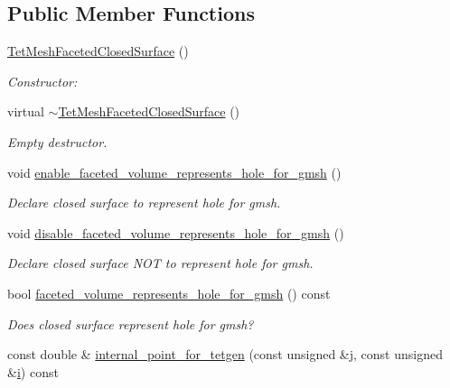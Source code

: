 \subsection*{Public Member Functions}
\begin{DoxyCompactItemize}
\item 
\hyperlink{classoomph_1_1TetMeshFacetedClosedSurface_a03485a256274531a3391fb0f86fa34ca}{Tet\+Mesh\+Faceted\+Closed\+Surface} ()
\begin{DoxyCompactList}\small\item\em Constructor\+: \end{DoxyCompactList}\item 
virtual \hyperlink{classoomph_1_1TetMeshFacetedClosedSurface_a5f1a8d02dedbefb9291d5480c146709d}{$\sim$\+Tet\+Mesh\+Faceted\+Closed\+Surface} ()
\begin{DoxyCompactList}\small\item\em Empty destructor. \end{DoxyCompactList}\item 
void \hyperlink{classoomph_1_1TetMeshFacetedClosedSurface_a3f8352fb0df78c37dafeaa94e0ccdce4}{enable\+\_\+faceted\+\_\+volume\+\_\+represents\+\_\+hole\+\_\+for\+\_\+gmsh} ()
\begin{DoxyCompactList}\small\item\em Declare closed surface to represent hole for gmsh. \end{DoxyCompactList}\item 
void \hyperlink{classoomph_1_1TetMeshFacetedClosedSurface_ac3fff849d4767b73c731c48afd058c0c}{disable\+\_\+faceted\+\_\+volume\+\_\+represents\+\_\+hole\+\_\+for\+\_\+gmsh} ()
\begin{DoxyCompactList}\small\item\em Declare closed surface N\+OT to represent hole for gmsh. \end{DoxyCompactList}\item 
bool \hyperlink{classoomph_1_1TetMeshFacetedClosedSurface_a470786aabd08b8c38fe50877109b6557}{faceted\+\_\+volume\+\_\+represents\+\_\+hole\+\_\+for\+\_\+gmsh} () const
\begin{DoxyCompactList}\small\item\em Does closed surface represent hole for gmsh? \end{DoxyCompactList}\item 
const double \& \hyperlink{classoomph_1_1TetMeshFacetedClosedSurface_abf713be60632d51d84d297f21ac6894f}{internal\+\_\+point\+\_\+for\+\_\+tetgen} (const unsigned \&j, const unsigned \&\hyperlink{cfortran_8h_adb50e893b86b3e55e751a42eab3cba82}{i}) const

\end{DoxyCompactItemize}

